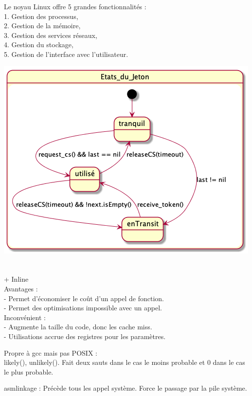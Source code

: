 \documentclass[11pt,a4paper]{report}
\begin{document}
Le noyau Linux offre 5 grandes fonctionnalités :\\
1. Gestion des processus,\\
2. Gestion de la mémoire,\\
3. Gestion des services réseaux,\\
4. Gestion du stockage,\\
5. Gestion de l’interface avec l’utilisateur.

\includegraphics[scale=0.3]{../Diagrammes/exercice_1-question_2.png}


\chapter{}


+ Inline\\
Avantages :\\
- Permet d’économiser le coût d’un appel de fonction.\\
- Permet des optimisations impossible avec un appel.\\
Inconvénient :\\
- Augmente la taille du code, donc les cache miss.\\
- Utilisations accrue des registres pour les paramètres.

Propre à gcc mais pas POSIX :\\
likely(), unlikely(). Fait deux sauts dans le cas le moins probable et 0 dans le cas le plus probable.

asmlinkage : Précède tous les appel système. Force le passage par la pile système.
\end{document}
